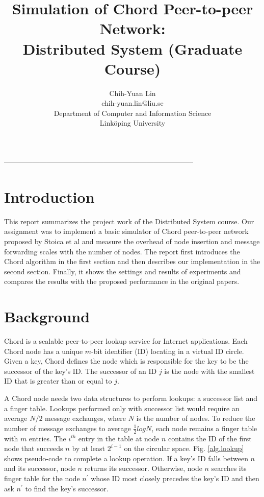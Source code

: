 \documentclass{article}
\title{Simulation of Chord Peer-to-peer Network: \\
Distributed System (Graduate Course)}
\author{Chih-Yuan Lin \\
chih-yuan.lin@liu.se \\
Department of Computer and Information Science\\
Linköping University\\}
\begin{document}
\maketitle
\begin{center}
--------------------------------------------------------------------------------\\
\end{center}

\section*{Introduction}
This report summarizes the project work of the Distributed System course. Our assignment was to implement a basic simulator of Chord peer-to-peer network proposed by Stoica et al \cite{paper, report} and measure the overhead of node insertion and message forwarding scales with the number of nodes. The report first introduces the Chord algorithm in the first section and then describes our implementation in the second section. Finally, it shows the settings and results of experiments and compares the results with the proposed performance in the original papers.

\section*{Background}
Chord is a scalable peer-to-peer lookup service for Internet applications. Each Chord node has a unique $m$-bit identifier (ID) locating in a virtual ID circle. Given a key, Chord defines the node which is responsible for the key to be the successor of the key's ID. The successor of an ID $j$ is the node with the smallest ID that is greater than or equal to $j$. 

A Chord node needs two data structures to perform lookups: a successor list and a finger table. Lookups performed only with successor list would require an average $N/2$ message exchanges, where $N$ is the number of nodes. To reduce the number of message exchanges to average $\frac{1}{2}logN$, each node remains a finger table with $m$ entries. The $i^{th}$ entry in the table at node $n$ contains the ID of the first node that succeeds $n$ by at least $2^{i-1}$ on the circular space. Fig. \ref{alg.lookup} shows pseudo-code to complete a lookup operation. If a key's ID falls between $n$ and its successor, node $n$ returns its successor. Otherwise, node $n$ searches its finger table for the node $n^\prime$ whose ID most closely precedes the key's ID and then ask $n^\prime$ to find the key's successor.
\end{document}

